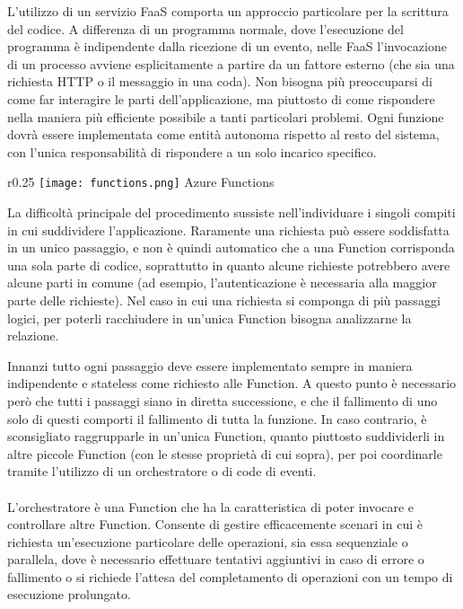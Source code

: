 L'utilizzo di un servizio FaaS comporta un approccio particolare per la scrittura del codice.
A differenza di un programma normale,
dove l'esecuzione del programma è indipendente dalla ricezione di un evento,
nelle FaaS l'invocazione di un processo avviene esplicitamente a partire da un fattore esterno
(che sia una richiesta HTTP o il messaggio in una coda).
Non bisogna più preoccuparsi di come far interagire le parti dell'applicazione,
ma piuttosto di come rispondere nella maniera più efficiente possibile a tanti particolari problemi.
Ogni funzione dovrà essere implementata come entità autonoma rispetto al resto del sistema,
con l'unica responsabilità di rispondere a un solo incarico specifico.\\
\begin{wrapfigure}{r}{0.25\textwidth}
    \centering
    \texttt{[image: functions.png]}
    Azure Functions
\end{wrapfigure}
La difficoltà principale del procedimento sussiste nell'individuare i singoli compiti
in cui suddividere l'applicazione.
Raramente una richiesta può essere soddisfatta in un unico passaggio,
e non è quindi automatico che a una Function corrisponda una sola parte di codice,
soprattutto in quanto alcune richieste potrebbero avere alcune parti in comune
(ad esempio, l'autenticazione è necessaria alla maggior parte delle richieste).
Nel caso in cui una richiesta si componga di più passaggi logici,
per poterli racchiudere in un'unica Function bisogna analizzarne la relazione.\\
\par
Innanzi tutto ogni passaggio deve essere implementato sempre in maniera indipendente e stateless
come richiesto alle Function.
A questo punto è necessario però che tutti i passaggi siano in diretta successione,
e che il fallimento di uno solo di questi comporti il fallimento di tutta la funzione.
In caso contrario, è sconsigliato raggrupparle in un'unica Function,
quanto piuttosto suddividerli in altre piccole Function (con le stesse proprietà di cui sopra),
per poi coordinarle tramite l'utilizzo di un orchestratore o di code di eventi.\\
\\
L'orchestratore è una Function che ha la caratteristica
di poter invocare e controllare altre Function.
Consente di gestire efficacemente scenari
in cui è richiesta un'esecuzione particolare delle operazioni, sia essa sequenziale o parallela,
dove è necessario effettuare tentativi aggiuntivi in caso di errore o fallimento o
si richiede l'attesa del completamento di operazioni con un tempo di esecuzione prolungato.
